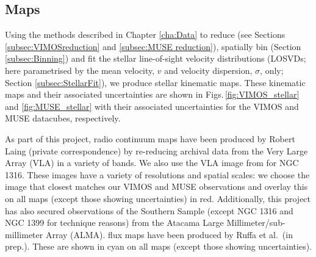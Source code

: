 	\subsection{Maps}
		\label{subsec:maps}
		Using the methods described in Chapter \ref{cha:Data} to reduce (see Sections \ref{subsec:VIMOSreduction} and \ref{subsec:MUSE reduction}), spatially bin (Section \ref{subsec:Binning}) and fit the stellar line-of-sight velocity distributions (LOSVDs; here parametrised by the mean velocity, $v$ and velocity dispersion, $\sigma$, only; Section \ref{subsec:StellarFit}), we produce stellar kinematic maps. These kinematic maps and their associated uncertainties are shown in Figs.\,\ref{fig:VIMOS_stellar} and \ref{fig:MUSE_stellar} with their associated uncertainties for the VIMOS and MUSE datacubes, respectively. 

		As part of this project, radio continuum maps have been produced by Robert Laing (private correspondence) by re-reducing archival data from the Very Large Array (VLA) in a variety of bands. We also use the VLA image from \citet{Lanz2010} for NGC 1316. These images have a variety of resolutions and spatial scales: we choose the image that closest matches our VIMOS and MUSE observations and overlay this on all maps (except those showing uncertainties) in red. Additionally, this project has also secured observations of the Southern Sample (except NGC 1316 and NGC 1399 for technique reasons) from the Atacama Large Millimeter/sub-millimeter Array (ALMA).  flux maps have been produced by Ruffa et al.\ (in prep.). These are shown in cyan on all maps (except those showing uncertainties). 



